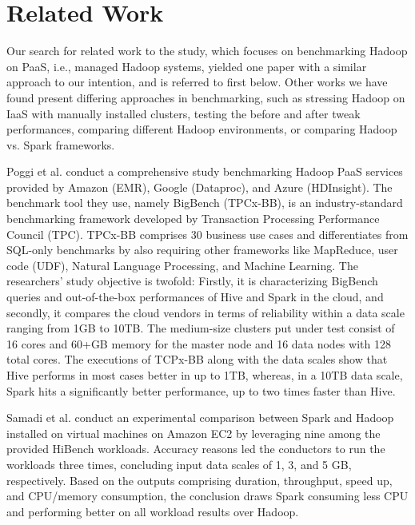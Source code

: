 \documentclass[review]{elsarticle}
\begin{document}
\section{Related Work}
Our search for related work to the study, which focuses on benchmarking Hadoop on PaaS, i.e., managed Hadoop systems, yielded one paper with a similar approach to our intention, and is referred to first below. Other works we have found present differing approaches in benchmarking, such as stressing Hadoop on IaaS with manually installed clusters, testing the before and after tweak performances, comparing different Hadoop environments, or comparing Hadoop vs. Spark frameworks.

Poggi et al. \cite{poggi_characterizing_2018} conduct a comprehensive study benchmarking Hadoop PaaS services provided by Amazon (EMR), Google (Dataproc), and Azure (HDInsight). The benchmark tool they use, namely BigBench (TPCx-BB), is an industry-standard benchmarking framework developed by Transaction Processing Performance Council (TPC). TPCx-BB comprises 30 business use cases and differentiates from SQL-only benchmarks by also requiring other frameworks like MapReduce, user code (UDF), Natural Language Processing, and Machine Learning. The researchers' study objective is twofold: Firstly, it is characterizing BigBench queries and out-of-the-box performances of Hive and Spark in the cloud, and secondly, it compares the cloud vendors in terms of reliability within a data scale ranging from 1GB to 10TB. The medium-size clusters put under test consist of 16 cores and 60+GB memory for the master node and 16 data nodes with 128 total cores. The executions of TCPx-BB along with the data scales show that Hive performs in most cases better in up to 1TB, whereas, in a 10TB data scale, Spark hits a significantly better performance, up to two times faster than Hive.

Samadi et al. \cite{samadi_performance_2018} conduct an experimental comparison between Spark and Hadoop installed on virtual machines on Amazon EC2 by leveraging nine among the provided HiBench workloads. Accuracy reasons led the conductors to run the workloads three times, concluding input data scales of 1, 3, and 5 GB, respectively. Based on the outputs comprising duration, throughput, speed up, and CPU/memory consumption, the conclusion draws Spark consuming less CPU and performing better on all workload results over Hadoop. 
\end{document}
